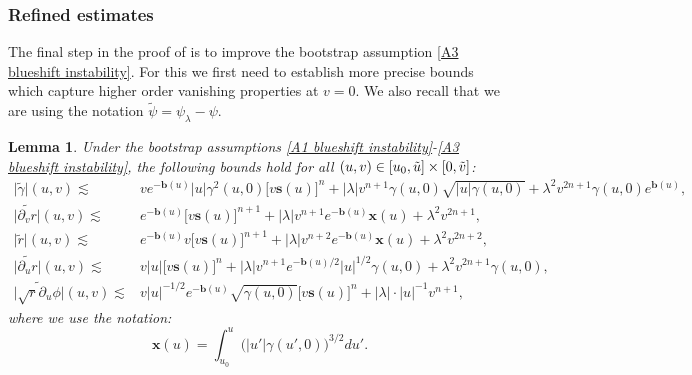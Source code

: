 \documentclass[11pt]{article}
\newtheorem{lemma}{Lemma}[section]
\numberwithin{equation}{section}
\begin{document}
\subsubsection{Refined estimates}\label{refined estimates section}
The final step in the proof of  is to improve the bootstrap assumption \eqref{A3 blueshift instability}. For this we first need to establish more precise bounds which capture higher order vanishing properties at $v=0.$ We also recall that we are using the notation $\widetilde{\psi}=\psi_{\lambda}-\psi.$
\begin{lemma}
    Under the bootstrap assumptions \eqref{A1 blueshift instability}-\eqref{A3 blueshift instability}, the following bounds hold for all $(u,v)\in[u_0,\Tilde{u}]\times[0,\Tilde{v}]$:
    \begin{align}
        \big|\widetilde{\gamma}\big|(u,v)\lesssim& ve^{-\mathbf{b}(u)}|u|\gamma^2(u,0)\big[v\mathbf{s}(u)\big]^{n}+|\lambda| v^{n+1}\gamma(u,0)\sqrt{|u|\gamma(u,0)}+\lambda^2v^{2n+1}\gamma(u,0)e^{\mathbf{b}(u)},\label{blueshift lemma bound 1}\\
        \big|\widetilde{\partial_vr}\big|(u,v)\lesssim& e^{-\mathbf{b}(u)}\big[v\mathbf{s}(u)\big]^{n+1}+|\lambda|v^{n+1}e^{-\mathbf{b}(u)}\mathbf{x}(u)+\lambda^2v^{2n+1},\label{blueshift lemma bound 2}\\
        \big|\widetilde{r}\big|(u,v)\lesssim & e^{-\mathbf{b}(u)}v\big[v\mathbf{s}(u)\big]^{n+1}+|\lambda| v^{n+2}e^{-\mathbf{b}(u)}\mathbf{x}(u)+\lambda^2v^{2n+2},\label{blueshift lemma bound 3}\\
        \big|\widetilde{\partial_ur}\big|(u,v)\lesssim& v|u|\big[v\mathbf{s}(u)\big]^{n}+|\lambda| v^{n+1}e^{-\mathbf{b}(u)/2}|u|^{1/2}\gamma(u,0)+\lambda^2 v^{2n+1}\gamma(u,0),\label{blueshift lemma bound 4}\\
        \big|\widetilde{\sqrt{r}\partial_u\phi}\big|(u,v)\lesssim& v|u|^{-1/2}e^{-\mathbf{b}(u)}\sqrt{\gamma(u,0)}\big[v\mathbf{s}(u)\big]^{n}+|\lambda|\cdot|u|^{-1}v^{n+1},\label{blueshift lemma bound 5}
    \end{align}
    where we use the notation:
    \[\mathbf{x}(u)=\int_{u_0}^u\big(|u'|\gamma(u',0)\big)^{3/2}du'.\]
\end{lemma}
\end{document}
